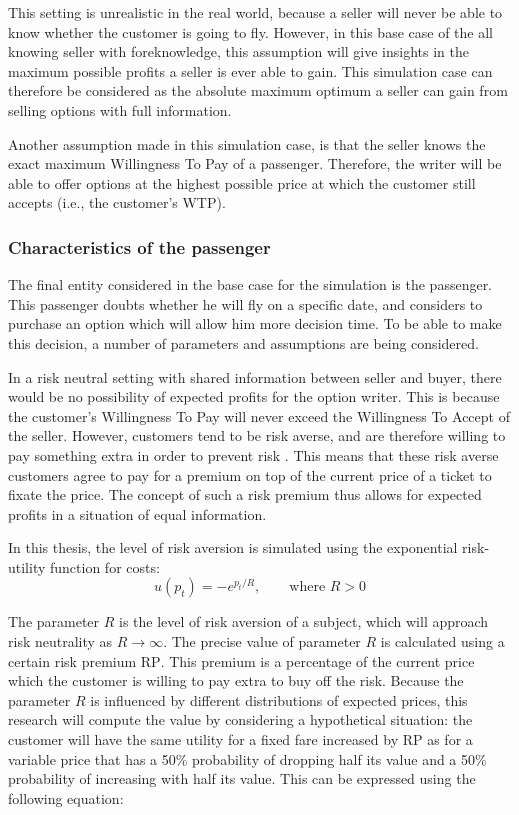 This setting is unrealistic in the real world, because a seller will never be able to know whether the customer is going to fly. However, in this base case of the all knowing seller with foreknowledge, this assumption will give insights in the maximum possible profits a seller is ever able to gain. This simulation case can therefore be considered as the absolute maximum optimum a seller can gain from selling options with full information.

Another assumption made in this simulation case, is that the seller knows the exact maximum Willingness To Pay of a passenger. Therefore, the writer will be able to offer options at the highest possible price at which the customer still accepts (i.e., the customer's WTP).


\subsubsection{Characteristics of the passenger}
The final entity considered in the base case for the simulation is the passenger. This passenger doubts whether he will fly on a specific date, and considers to purchase an option which will allow him more decision time. To be able to make this decision, a number of parameters and assumptions are being considered.

In a risk neutral setting with shared information between seller and buyer, there would be no possibility of expected profits for the option writer. This is because the customer's Willingness To Pay will never exceed the Willingness To Accept of the seller. However, customers tend to be risk averse, and are therefore willing to pay something extra in order to prevent risk . This means that these risk averse customers agree to pay for a premium on top of the current price of a ticket to fixate the price. The concept of such a risk premium thus allows for expected profits in a situation of equal information.

In this thesis, the level of risk aversion is simulated using the exponential risk-utility function for costs:
$$
u(p_t) = -e^{p_t/R},\hspace{2em}\text{where } R > 0
$$

The parameter $R$ is the level of risk aversion of a subject, which will approach risk neutrality as $R \rightarrow \infty$. The precise value of parameter $R$ is calculated using a certain risk premium $\mbox{RP}$. This premium is a percentage of the current price which the customer is willing to pay extra to buy off the risk. Because the parameter $R$ is influenced by different distributions of expected prices, this research will compute the value by considering a hypothetical situation: the customer will have the same utility for a fixed fare increased by $\mbox{RP}$ as for a variable price that has a 50\% probability of dropping half its value and a 50\% probability of increasing with half its value. This can be expressed using the following equation: 

